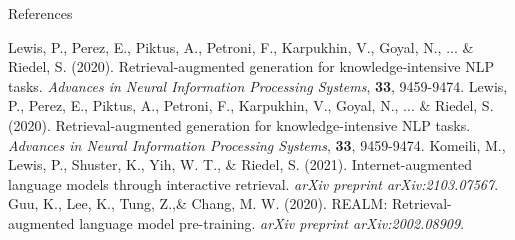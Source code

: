 \begin{frame}{References}
    \begin{thebibliography}{9}
        Lewis, P., Perez, E., Piktus, A., Petroni, F., Karpukhin, V., Goyal, N., ... \& Riedel, S. (2020). Retrieval-augmented generation for knowledge-intensive NLP tasks. \textit{Advances in Neural Information Processing Systems}, \textbf{33}, 9459-9474.
        Lewis, P., Perez, E., Piktus, A., Petroni, F., Karpukhin, V., Goyal, N., ... \& Riedel, S. (2020). Retrieval-augmented generation for knowledge-intensive NLP tasks. \textit{Advances in Neural Information Processing Systems}, \textbf{33}, 9459-9474.
                Komeili, M., Lewis, P., Shuster, K., Yih, W. T., \& Riedel, S. (2021). Internet-augmented language models through interactive retrieval. \textit{arXiv preprint arXiv:2103.07567}.
                Guu, K., Lee, K., Tung, Z.,\& Chang, M. W. (2020). REALM: Retrieval-augmented language model pre-training. \textit{arXiv preprint arXiv:2002.08909}.

    \end{thebibliography}
\end{frame}



